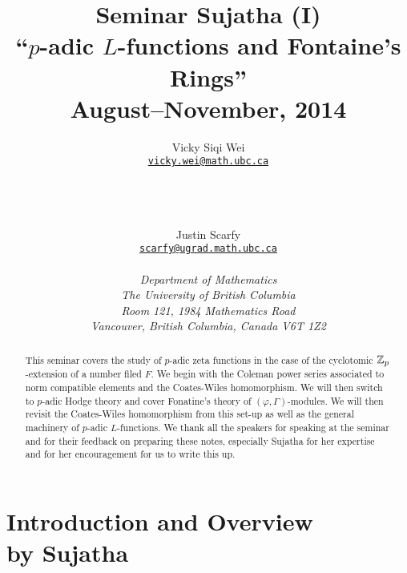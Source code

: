 \documentclass[12pt,amsfont]{amsart}
\begin{document}
\title{\bf Seminar Sujatha (I)\\``$p$-adic $L$-functions and Fontaine's Rings''\\ August--November, 2014}
\author{Vicky Siqi Wei \\ \href{mailto:vicky.wei@math.ubc.ca}{
{\texttt{\lowercase{vicky.wei@math.ubc.ca}}} \\ }\\ 
\and \\ \\ Justin Scarfy\\
\href{mailto:scarfy@ugrad.math.ubc.ca}{
{\texttt{\lowercase{scarfy@ugrad.math.ubc.ca}}} }
\\
\\
{\textnormal{\textit{D{\lowercase{epartment of }}M{\lowercase{athematics}}\\ T\lowercase{he} U\lowercase{niversity of} B\lowercase{ritish} C\lowercase{olumbia}\\ R\lowercase{oom} 121, 1984 M\lowercase{athematics} R\lowercase{oad}\\V\lowercase{ancouver}, B\lowercase{ritish} C\lowercase{olumbia}, C\lowercase{anada} V6T 1Z2}}}}
\begin{abstract}
This seminar covers the study of $p$-adic zeta functions in the case of the cyclotomic
${\mathbb Z}_p$-extension of a number filed $F$. We begin with the Coleman power series associated to norm compatible elements and the Coates-Wiles homomorphism. We will then switch to $p$-adic Hodge theory and cover Fonatine's theory of $(\varphi, \Gamma)$-modules. We will then revisit the Coates-Wiles homomorphism from this set-up as well as the general machinery of $p$-adic $L$-functions.  We thank all the speakers for speaking at the seminar and for their feedback on preparing these notes, especially Sujatha for her expertise and for her encouragement for us to write this up.
\end{abstract}

\maketitle

\setcounter{tocdepth}{1}
\tableofcontents

\setcounter{section}{-1}
\newpage
\section{Introduction and Overview\\ by Sujatha}\label{0}
\end{document}
